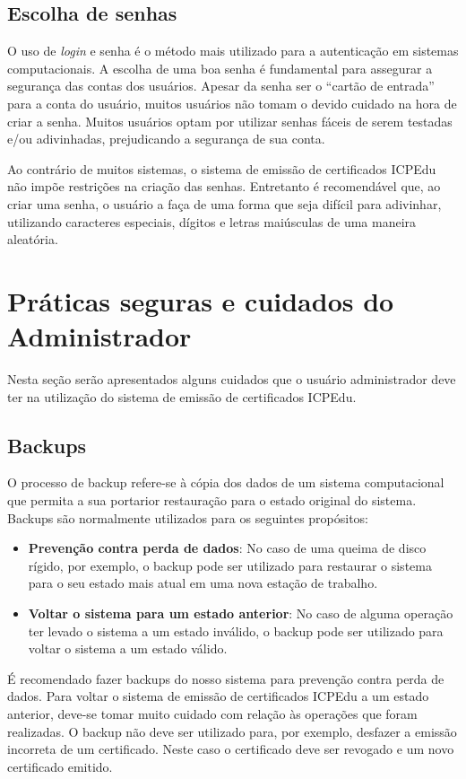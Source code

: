 \subsection{Escolha de senhas}

O uso de \textit{login} e senha é o método mais utilizado para a autenticação em sistemas computacionais. A escolha de uma boa senha é fundamental para assegurar a segurança das contas dos usuários.
Apesar da senha ser o ``cartão de entrada'' para a conta do usuário, muitos usuários não tomam o devido cuidado na hora de criar a senha.
Muitos usuários optam por utilizar senhas fáceis de serem testadas e/ou adivinhadas, prejudicando a segurança de sua conta.

Ao contrário de muitos sistemas, o sistema de emissão de certificados ICPEdu não impõe restrições na criação das senhas. Entretanto é recomendável que, ao criar uma senha, o usuário a faça  de uma forma que seja difícil para adivinhar, utilizando caracteres especiais, dígitos e letras maiúsculas de uma maneira aleatória.

\section{Práticas seguras e cuidados do Administrador}

Nesta seção serão apresentados alguns cuidados que o usuário administrador deve ter na utilização do sistema de emissão de certificados ICPEdu.


\subsection{Backups}

O processo de backup refere-se à cópia dos dados de um sistema computacional que permita a sua portarior restauração para o estado original do sistema. Backups são normalmente utilizados para os seguintes propósitos:

\begin{itemize}
 \item \textbf{Prevenção contra perda de dados}: No caso de uma queima de disco rígido, por exemplo, o backup pode ser utilizado para restaurar o sistema para o seu estado mais atual em uma nova estação de trabalho. 
 \item \textbf{Voltar o sistema para um estado anterior}: No caso de alguma operação ter levado o sistema a um estado inválido, o backup pode ser utilizado para voltar o sistema a um estado válido.
\end{itemize}

É recomendado fazer backups do nosso sistema para prevenção contra perda de dados. Para voltar o sistema de emissão de certificados ICPEdu a um estado anterior, deve-se tomar muito cuidado com relação às operações que foram realizadas.
O backup não deve ser utilizado para, por exemplo, desfazer a emissão incorreta de um certificado. Neste caso o certificado deve ser revogado e um novo certificado emitido.


